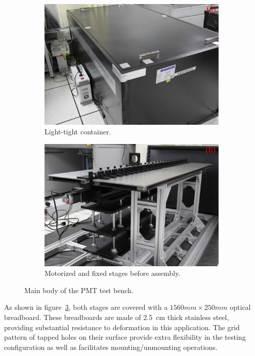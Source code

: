 \documentclass{JINST}
\begin{document}
\begin{figure}[tbp]
	
	\begin{subfigure}[t]{0.5\textwidth}
		\includegraphics[width=0.98\linewidth]{FIG2_a}
		\caption{Light-tight container.}
		\label{fig:FIG2_a}
	\end{subfigure}
	\begin{subfigure}[t]{0.5\textwidth}
		\includegraphics[width=0.98\linewidth]{FIG2_b}
		\caption{Motorized and fixed stages before assembly.}
		\label{fig:FIG2_b}
	\end{subfigure}
	
	\caption{Main body of the PMT test bench.}
	\label{fig:FIG2}
\end{figure}

As shown in figure~\ref{fig:FIG2}, both stages are covered with a $1560mm\times250mm$ optical breadboard. 
These breadboards are made of \SI{2.5}{cm} thick stainless steel, providing substantial resistance to deformation in this application. 
The grid pattern of tapped holes on their surface provide extra flexibility in the testing configuration as well as facilitates mounting/unmounting operations.
	
\end{document}
